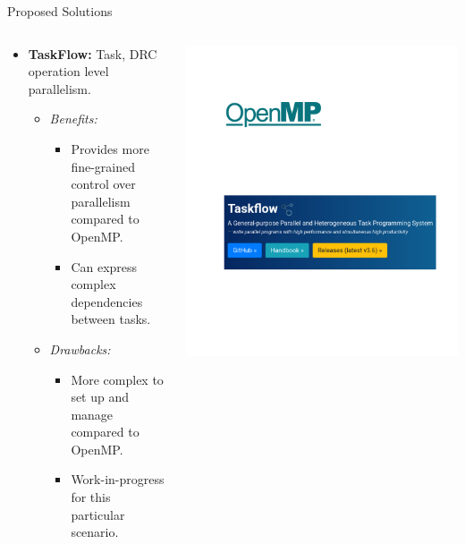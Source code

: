 \documentclass[aspectratio=169]{beamer} %
\begin{document}
\begin{frame}{Proposed Solutions}
\begin{columns}[T]
\begin{column}{.6\textwidth}
\begin{itemize}
                \item \textbf{TaskFlow:} Task, DRC operation level parallelism.
                \begin{itemize}
                    \item \textit{Benefits:}
                        \begin{itemize}
                            \item Provides more fine-grained control over parallelism compared to OpenMP.
                            \item Can express complex dependencies between tasks.
                        \end{itemize}
                    \item \textit{Drawbacks:}
                        \begin{itemize}
                            \item More complex to set up and manage compared to OpenMP.
                            \item Work-in-progress for this particular scenario.
                        \end{itemize}
                \end{itemize}
            \end{itemize}
            \end{column}
            \begin{column}{.4\textwidth}
            \begin{center}
                \includegraphics[width=\textwidth,height=0.8\textheight,keepaspectratio]{solutions.png}

\end{center}
\end{column}
\end{columns}
\end{frame}
\end{document}
